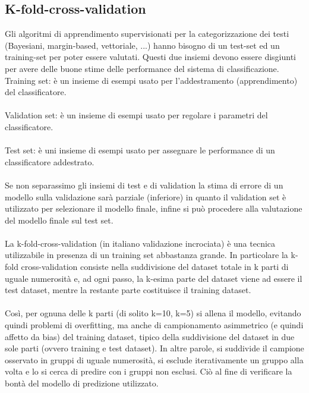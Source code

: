 \documentclass{article}
\theoremstyle{plain}
\theoremstyle{definition}
\begin{document}
\subsection{K-fold-cross-validation}
Gli algoritmi di apprendimento supervisionati per la categorizzazione dei testi (Bayesiani, margin-based, vettoriale, ...) hanno bisogno di un test-set ed un training-set per poter essere valutati. Questi due insiemi devono essere disgiunti per avere delle buone stime delle performance del sistema di classificazione.
\\
Training set: è un insieme di esempi usato per l'addestramento (apprendimento) del classificatore.
\\
\\
Validation set: è un insieme di esempi usato per regolare i parametri del classificatore.
\\
\\
Test set: è uni insieme di esempi usato per assegnare le performance di un classificatore addestrato.
\\
\\
Se non separassimo gli insiemi di test e di validation la stima di errore di un modello sulla validazione sarà parziale (inferiore) in quanto il validation set è utilizzato per selezionare il modello finale, infine si può procedere alla valutazione del modello finale sul test set.
\\
\\
La k-fold-cross-validation (in italiano validazione incrociata) è una tecnica utilizzabile in presenza di un training set abbastanza grande. In particolare la k-fold cross-validation consiste nella suddivisione del dataset totale in k parti di uguale numerosità e, ad ogni passo, la k-esima parte del dataset viene ad essere il test dataset, mentre la restante parte costituisce il training dataset.
\\
\\
Così, per ognuna delle k parti (di solito k=10, k=5) si allena il modello, evitando quindi problemi di overfitting, ma anche di campionamento asimmetrico (e quindi affetto da bias) del training dataset, tipico della suddivisione del dataset in due sole parti (ovvero training e test dataset). In altre parole, si suddivide il campione osservato in gruppi di uguale numerosità, si esclude iterativamente un gruppo alla volta e lo si cerca di predire con i gruppi non esclusi. Ciò al fine di verificare la bontà del modello di predizione utilizzato.
\end{document}
